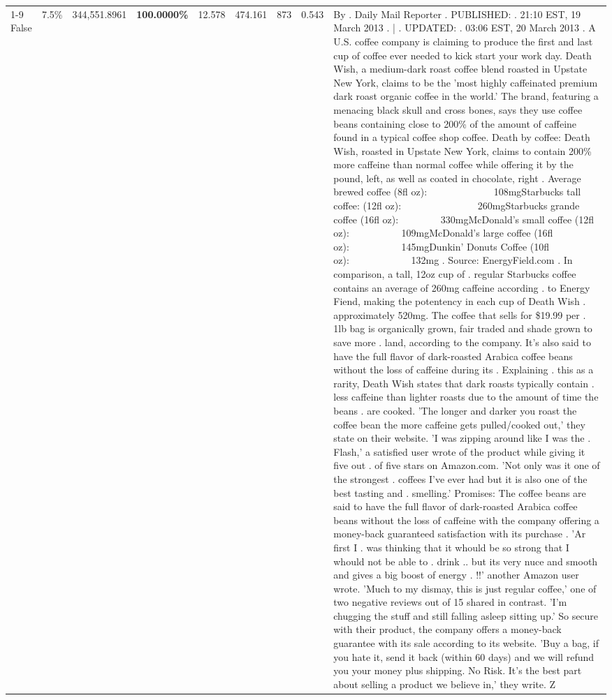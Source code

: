 \begin{table}[H]
{\begin{tabular}{lllrlllll}
\cline{1-9}
False & 7.5\% & 344,551.8961 & \bfseries \color{red} 100.0000\% & 12.578 & 474.161 & 873 & 0.543 & By . Daily Mail Reporter . PUBLISHED: . 21:10 EST, 19 March 2013 . | . UPDATED: . 03:06 EST, 20 March 2013 . A U.S. coffee company is claiming to produce the first and last cup of coffee ever needed to kick start your work day. Death Wish, a medium-dark roast coffee blend roasted in Upstate New York, claims to be the 'most highly caffeinated premium dark roast organic coffee in the world.' The brand, featuring a menacing black skull and cross bones, says they use coffee beans containing close to 200\% of the amount of caffeine found in a typical coffee shop coffee. Death by coffee: Death Wish, roasted in Upstate New York, claims to contain 200\% more caffeine than normal coffee while offering it by the pound, left, as well as coated in chocolate, right . Average brewed coffee (8fl oz):              108mgStarbucks tall coffee: (12fl oz):                260mgStarbucks grande coffee (16fl oz):         330mgMcDonald's small coffee (12fl oz):           109mgMcDonald's large coffee (16fl oz):           145mgDunkin' Donuts Coffee (10fl oz):             132mg . Source: EnergyField.com . In comparison, a tall, 12oz cup of . regular Starbucks coffee contains an average of 260mg caffeine according . to Energy Fiend, making the potentency in each cup of Death Wish . approximately 520mg. The coffee that sells for \$19.99 per . 1lb bag is organically grown, fair traded and shade grown to save more . land, according to the company. It's also said to have the full flavor of dark-roasted Arabica coffee beans without the loss of caffeine during its . Explaining . this as a rarity, Death Wish states that dark roasts typically contain . less caffeine than lighter roasts due to the amount of time the beans . are cooked. 'The longer and darker you roast the coffee bean the more caffeine gets pulled/cooked out,' they state on their website. 'I was zipping around like I was the . Flash,' a satisfied user wrote of the product while giving it five out . of five stars on Amazon.com. 'Not only was it one of the strongest . coffees I've ever had but it is also one of the best tasting and . smelling.’ Promises: The coffee beans are said to have the full flavor of dark-roasted Arabica coffee beans without the loss of caffeine with the company offering a money-back guaranteed satisfaction with its purchase . 'Ar first I . was thinking that it whould be so strong that I whould not be able to . drink .. but its very nuce and smooth and gives a big boost of energy . !!' another Amazon user wrote. 'Much to my dismay, this is just regular coffee,' one of two negative reviews out of 15 shared in contrast. 'I'm chugging the stuff and still falling asleep sitting up.' So secure with their product, the company offers a money-back guarantee with its sale according to its website. 'Buy a bag, if you hate it, send it back (within 60 days) and we will refund you your money plus shipping. No Risk. It’s the best part about selling a product we believe in,' they write. Z \\

\end{tabular}}
\end{table}
